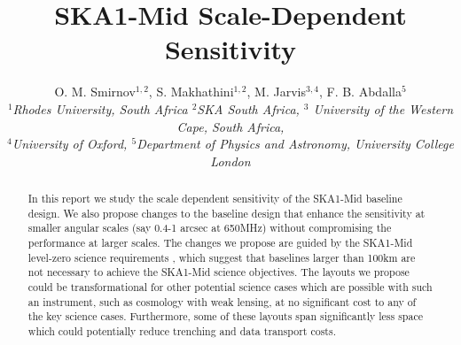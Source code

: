 \documentclass[sfheadings,a4paper,times,9pt,floats,floatfix]{article}
\title{SKA1-Mid Scale-Dependent Sensitivity}
\author{O. M. Smirnov$^{1,2}$, S. Makhathini$^{1,2}$, M. Jarvis$^{3,4}$, F. B. Abdalla$^5$ \\{\footnotesize \it $^1$Rhodes
University, South Africa $^2$SKA South Africa, $^3$ University of the Western Cape, South Africa,}\\ {\footnotesize \it
$^4$University of Oxford, $^5$Department of Physics and Astronomy, University College London}}
\date{}
\begin{document}
\maketitle
\vspace{-1.1cm}
\begin{abstract}
 In this report we study the scale dependent sensitivity of the SKA1-Mid baseline design. We also propose changes to the baseline
design that enhance the sensitivity at smaller angular scales (say 0.4-1 arcsec at 650MHz) without compromising the performance at
larger scales. The changes we propose are guided by the SKA1-Mid level-zero science requirements \cite{srd}, which suggest that
baselines larger than 100km are not necessary to achieve the SKA1-Mid science objectives. The layouts we propose could be
transformational for other potential science cases which are possible with such an instrument, such as cosmology with weak
lensing, at no significant cost to any of the key science cases. Furthermore, some of these layouts span significantly less space
which could potentially reduce trenching and data transport costs.
\end{abstract}
\end{document}
